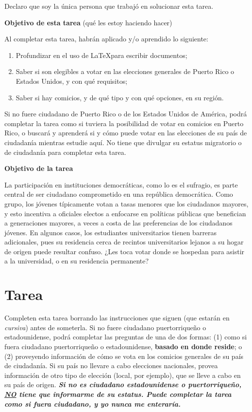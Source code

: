 \documentclass[11pt]{article} %
\begin{document}
Declaro que soy la única persona que trabajó en solucionar esta tarea.
\newpage

\textbf{Objetivo de esta tarea} (qué les estoy haciendo hacer)

Al completar esta tarea, habrán aplicado y/o aprendido lo siguiente:
\begin{enumerate}
    \item Profundizar en el uso de \LaTeX para escribir documentos;
    \item Saber si son elegibles a votar en las elecciones generales de Puerto Rico o Estados Unidos, y con qué requisitos;
    \item Saber si hay comicios, y de qué tipo y con qué opciones, en su región.
\end{enumerate}

Si no fuere ciudadano de Puerto Rico o de los Estados Unidos de América, podrá completar la tarea como si tuviera la posibilidad de votar en comicios en Puerto Rico, o buscará y aprenderá si y cómo puede votar en las elecciones de su país de ciudadanía mientras estudie aquí. No tiene que divulgar su estatus migratorio o de ciudadanía para completar esta tarea.

\textbf{Objetivo de la tarea}

La participación en instituciones democráticas, como lo es el sufragio, es parte central de ser ciudadano comprometido en una república democrática. Como grupo, los jóvenes típicamente votan a tasas menores que los ciudadanos mayores, y esto incentiva a oficiales electos a enfocarse en políticas públicas que benefician a generaciones mayores, a veces a costa de las preferencias de los ciudadanos jóvenes. En algunos casos, los estudiantes universitarios tienen barreras adicionales, pues su residencia cerca de recintos universitarios lejanos a su hogar de origen puede resultar confuso. ¿Les toca votar donde se hospedan para asistir a la universidad, o en su residencia permanente? 

\section*{Tarea}

Completen esta tarea borrando las instrucciones que siguen (que estarán en \textit{cursiva}) antes de someterla. Si no fuere ciudadano puertorriqueño o estadounidense, podrá completar las preguntas de una de dos formas: (1) como si fuera ciudadano puertorriqueño o estadounidense, \textbf{basado en donde reside}; o (2) proveyendo información de cómo se vota en los comicios generales de su país de ciudadanía. Si su país no llevare a cabo elecciones nacionales, provea información de otro tipo de elección (local, por ejemplo), que se lleve a cabo en su país de origen. \textbf{\textit{Si no es ciudadano estadounidense o puertorriqueño, \underline{NO} tiene que informarme de su estatus. Puede completar la tarea como si fuera ciudadano, y yo nunca me enteraría.}}
\end{document}
